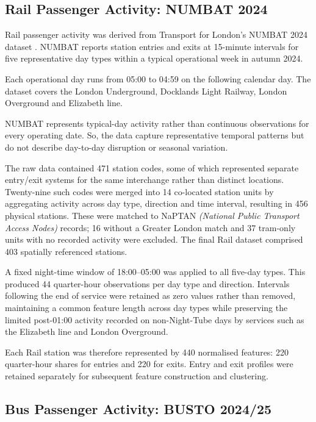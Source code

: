 \subsection{Rail Passenger Activity: NUMBAT 2024}

Rail passenger activity was derived from Transport for London's NUMBAT 2024 dataset \citep{TfL2024NUMBAT}. NUMBAT reports station entries and exits at 15-minute intervals for five representative day types within a typical operational week in autumn 2024.

Each operational day runs from 05:00 to 04:59 on the following calendar day. The dataset covers the London Underground, Docklands Light Railway, London Overground and Elizabeth line.

NUMBAT represents typical-day activity rather than continuous observations for every operating date. So, the data capture representative temporal patterns but do not describe day-to-day disruption or seasonal variation.

The raw data contained 471 station codes, some of which represented separate entry/exit systems for the same interchange rather than distinct locations. Twenty-nine such codes were merged into 14 co-located station units by aggregating activity across day type, direction and time interval, resulting in 456 physical stations. These were matched to NaPTAN \emph{(National Public Transport Access Nodes)} records; 16 without a Greater London match and 37 tram-only units with no recorded activity were excluded. The final Rail dataset comprised 403 spatially referenced stations.

A fixed night-time window of 18:00--05:00 was applied to all five-day types. This produced 44 quarter-hour observations per day type and direction. Intervals following the end of service were retained as zero values rather than removed, maintaining a common feature length across day types while preserving the limited post-01:00 activity recorded on non-Night-Tube days by services such as the Elizabeth line and London Overground.

Each Rail station was therefore represented by 440 normalised features: 220 quarter-hour shares for entries and 220 for exits. Entry and exit profiles were retained separately for subsequent feature construction and clustering.

\subsection{Bus Passenger Activity: BUSTO 2024/25}

